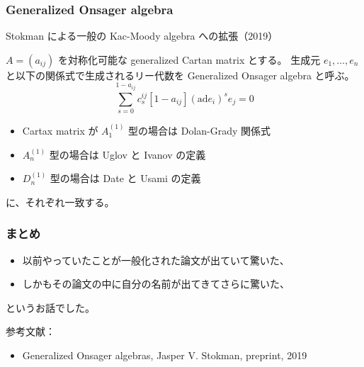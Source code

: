 \documentclass{beamer}
\theoremstyle{definition}
\begin{document}
\begin{frame}
    \frametitle{Generalized Onsager algebra}

    Stokman による一般の Kac-Moody algebra への拡張（2019）

    \begin{definition}
        \(A = (a_{ij})\) を対称化可能な generalized Cartan matrix とする。
        生成元 \(e_1, \dots, e_n\) と以下の関係式で生成されるリー代数を Generalized Onsager algebra と呼ぶ。
        \[
            \sum_{s=0}^{1-a_{ij}} c_s^{ij}[1-a_{ij}] {(\mathrm{ad} e_i)}^s e_j = 0
        \]
    \end{definition}

    \begin{itemize}
        \item Cartax matrix が \(A_1^{(1)}\) 型の場合は Dolan-Grady 関係式
        \item \(A_n^{(1)}\) 型の場合は Uglov と Ivanov の定義
        \item \(D_n^{(1)}\) 型の場合は Date と Usami の定義
    \end{itemize}
    に、それぞれ一致する。
\end{frame}

\begin{frame}
    \frametitle{まとめ}

    \begin{itemize}
        \item 以前やっていたことが一般化された論文が出ていて驚いた、
        \item しかもその論文の中に自分の名前が出てきてさらに驚いた、
    \end{itemize}
    というお話でした。

    参考文献：
    \begin{itemize}
        \item Generalized Onsager algebras, Jasper V. Stokman, preprint, 2019
    \end{itemize}
\end{frame}
\end{document}
